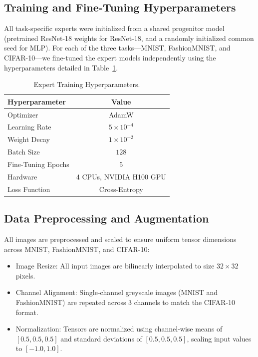 \documentclass{article}
\theoremstyle{plain}
\theoremstyle{definition}
\theoremstyle{remark}
\begin{document}
\subsection{Training and Fine-Tuning Hyperparameters}
All task-specific experts were initialized from a shared progenitor model (pretrained ResNet-18 weights for ResNet-18, and a randomly initialized common seed for MLP).
For each of the three tasks—MNIST, FashionMNIST, and CIFAR-10—we fine-tuned the expert models independently using the hyperparameters detailed in Table~\ref{tab:hyperparameters}.

\begin{table}[h]
\caption{Expert Training Hyperparameters.}
\label{tab:hyperparameters}
\vskip 0.1in
\begin{center}
\begin{small}
\begin{sc}
\begin{tabular}{lc}
\toprule
Hyperparameter & Value \\
\midrule
Optimizer & AdamW \\
Learning Rate & $5 \times 10^{-4}$ \\
Weight Decay & $1 \times 10^{-2}$ \\
Batch Size & $128$ \\
Fine-Tuning Epochs & $5$ \\
Hardware & 4 CPUs, NVIDIA H100 GPU \\
Loss Function & Cross-Entropy \\
\bottomrule
\end{tabular}
\end{sc}
\end{small}
\end{center}
\end{table}

\subsection{Data Preprocessing and Augmentation}
All images are preprocessed and scaled to ensure uniform tensor dimensions across MNIST, FashionMNIST, and CIFAR-10:
\begin{itemize}
  \item Image Resize: All input images are bilinearly interpolated to size $32 \times 32$ pixels.
  \item Channel Alignment: Single-channel greyscale images (MNIST and FashionMNIST) are repeated across 3 channels to match the CIFAR-10 format.
  \item Normalization: Tensors are normalized using channel-wise means of $[0.5, 0.5, 0.5]$ and standard deviations of $[0.5, 0.5, 0.5]$, scaling input values to $[-1.0, 1.0]$.
\end{itemize}
\end{document}
